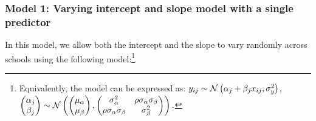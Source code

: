 \subsubsection*{Model 1: Varying intercept and slope model with a single predictor}
\label{subsubsection:model}
In this model, we allow both the intercept and the slope to vary randomly across schools using the following model:\footnote{Equivalently, the model can be expressed as: $y_{ij}\sim \mathcal{N}\left(\alpha_{j}+\beta_{j}x_{ij} , \sigma_y ^2 \right)$, $\left( \begin{matrix} \alpha _{ j } \\ \beta _{ j } \end{matrix} \right) \sim \mathcal{N}\left( \left( \begin{matrix} { \mu  }_{ \alpha  } \\ { \mu  }_{ \beta  } \end{matrix} \right) , \left( \begin{matrix} { \sigma  }_{ \alpha  }^{ 2 } & \rho { \sigma  }_{ \alpha  }{ \sigma  }_{ \beta  } \\ \rho { \sigma  }_{ \alpha  }{ \sigma  }_{ \beta  } & { \sigma  }_{ \beta  }^{ 2 } \end{matrix} \right)\right).$}

